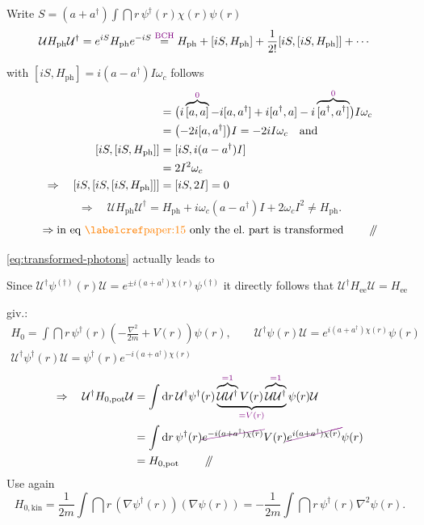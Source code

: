  Write \(S=(a+a^\dagger)\int \dint r\,\psi^\dagger(r)\chi(r)\psi(r)\)
\qquad {}
\begin{align*}
\mathcal U H_{\mathrm{ph}}\mathcal U^\dagger
 &=e^{iS}H_{\mathrm{ph}}e^{-iS}
 \overset{\textcolor{violet}{\text{BCH}}}{=} H_{\mathrm{ph}}+[iS,H_{\mathrm{ph}}]
    +\frac{1}{2!}[iS,[iS,H_{\mathrm{ph}}]]+\cdots
\end{align*}

with \([iS,H_{\mathrm{ph}}]=i(a-a^\dagger)I\omega_c\) follows
\begin{align*}
[a+a^\dagger,i(a-a^\dagger)I]
  &=\bigl(i\overbrace{[a,a]}^{\annotation{0}}-i[a,a^\dagger]
       +i[a^\dagger,a]-i\overbrace{[a^\dagger,a^\dagger]}^{\annotation{0}}
      \bigr)I\omega_c\\
  &=\bigl(-2i[a,a^\dagger]\bigr)I=-2iI\omega_c\quad\text{and}\\
[iS,[iS,H_{\mathrm{ph}}]]
  &=[iS,i(a-a^\dagger)I]\\
  &=2I^2\omega_c\\
\Rightarrow\quad[iS,[iS,[iS,H_{\mathrm{ph}}]]]
  &=[iS,2I]=0
\end{align*}
\begin{equation}
\Rightarrow\quad\mathcal U H_{\mathrm{ph}}\mathcal U^\dagger
 =H_{\mathrm{ph}}+i\omega_c(a-a^\dagger)I+2\omega_c I^2
 \ne H_{\mathrm{ph}}.
\label{eq:transformed-photons}
\end{equation}
\[
\Rightarrow \text{in eq \paperref{paper:15} only the el.\ part is transformed}
\qquad\done
\]

 \cref{eq:transformed-photons} actually leads to 
\quad {}

 Since
\(\mathcal U^\dagger\psi^{(\dagger)}(r)\mathcal U
 =e^{\pm i(a+a^\dagger)\chi(r)}\psi^{(\dagger)}\)
it directly follows that
\(\mathcal U^\dagger H_{\mathrm{ee}}\mathcal U=H_{\mathrm{ee}}\)

 giv.:
\begin{gather*}
H_0=\int \dint r\,\psi^\dagger(r)
    \left(-\frac{\nabla^2}{2m}+V(r)\right)\psi(r),
\qquad
\mathcal U^\dagger\psi(r)\mathcal U=e^{i(a+a^\dagger)\chi(r)}\psi(r)\\
\mathcal U^\dagger\psi^\dagger(r)\mathcal U
   =\psi^\dagger(r)e^{-i(a+a^\dagger)\chi(r)}
\end{gather*}
\begin{align*}
\Rightarrow\quad\mathcal U^\dagger H_{0,\mathrm{pot}}\mathcal U
 &=\int \dint r\,
   \mathcal U^\dagger\psi^\dagger(r)
   \underbrace{\overbrace{\mathcal U\mathcal U^\dagger}^{\annotation{=1}}
       V(r)\overbrace{\mathcal U\mathcal U^\dagger}^{\annotation{=1}}}
       _{\annotation{=V(r)}}\psi(r)\mathcal U\\
 &=\int \dint r\,\psi^\dagger(r)\crossout{e^{-i(a+a^\dagger)\chi(r)}}
       V(r)\crossout{e^{i(a+a^\dagger)\chi(r)}}\psi(r)\\
 &=H_{0,\mathrm{pot}}\qquad\done
\end{align*}
Use again
\[
H_{0,\mathrm{kin}}
  =\frac{1}{2m}\int \dint r\,(\nabla\psi^\dagger(r))(\nabla\psi(r))
  =-\frac{1}{2m}\int \dint r\,\psi^\dagger(r)\nabla^2\psi(r).
\]

